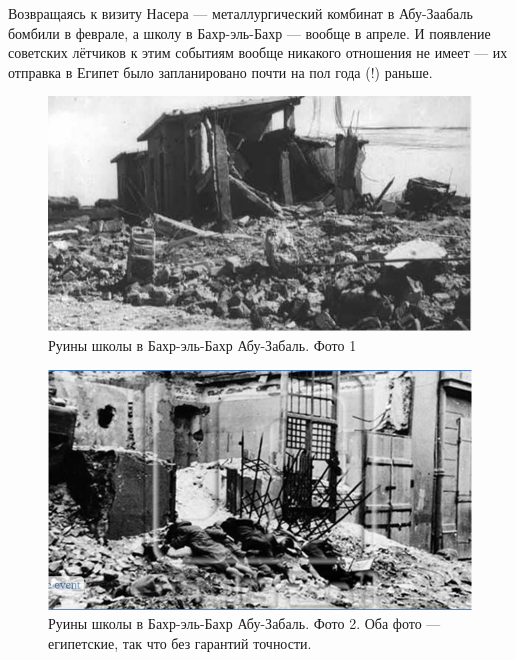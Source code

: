 Возвращаясь к визиту Насера — металлургический комбинат в Абу-Заабаль бомбили в феврале, а школу в Бахр-эль-Бахр — вообще в апреле. И появление советских лётчиков к этим событиям вообще никакого отношения не имеет — их отправка в Египет было запланировано почти на пол года (!) раньше.

\begin{figure}[h!tb] 
	\centering\includegraphics[scale=0.4]{Dolina_2/ByjCq0JSD0Q.jpg}
	\caption{Руины школы в Бахр-эль-Бахр Абу-Забаль. Фото 1}%
\end{figure}

\begin{figure}[h!tb] 
	\centering\includegraphics[scale=0.4]{Dolina_2/x-cyre6EBMg.jpg}
	\caption{Руины школы в Бахр-эль-Бахр Абу-Забаль. Фото 2. Оба фото — египетские, так что без гарантий точности.}%
\end{figure}

